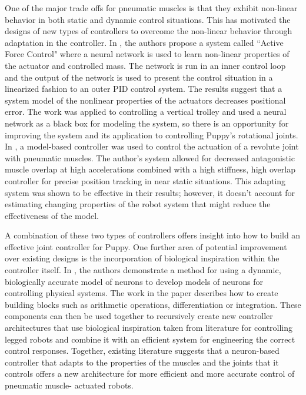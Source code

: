 One of the major trade offs for pneumatic muscles is that they exhibit
non-linear behavior in both static and dynamic control situations.
\cite{HuntPMuscles, DynamicPMuscles} This has
motivated the designs of new types of controllers to overcome the non-linear
behavior through adaptation in the controller. In \cite{Jahanabadi2009}, the
authors propose a system called ``Active Force Control" where a neural network
is used to learn non-linear properties of the actuator and controlled mass.
The network is run in an inner control loop and the output of the network is
used to present the control situation in a linearized fashion to an outer PID
control system. The results suggest that a system model of the nonlinear
properties of the actuators decreases positional error. The work was
applied to controlling a vertical trolley and used a neural network as a black
box for modeling the system, so there is an opportunity for improving the
system and its application to controlling Puppy's rotational joints.
In \cite{Wang2013}, a model-based controller was used to control the actuation
of a revolute joint with pneumatic muscles. The author's system allowed for
decreased antagonistic muscle overlap at high accelerations combined with a
high stiffness, high overlap controller for precise position tracking in near
static situations. This adapting system was shown to be effective in their
results; however, it doesn't account for estimating changing properties of the
robot system that might reduce the effectiveness of the model.

A combination of these two types of controllers offers insight into how to build
an effective joint controller for Puppy. One further area of potential
improvement over existing designs is the incorporation of biological inspiration
within the controller itself. In \cite{NickFunctionalSubnetwork}, the authors
demonstrate a method for using a dynamic, biologically accurate model of neurons
to develop models of neurons for controlling physical systems. The work in the
paper describes how to create building blocks such as arithmetic operations,
differentiation or integration. These components can then be used together to
recursively create new controller architectures that use biological inspiration
taken from literature for controlling legged robots and combine it with an
efficient system for engineering the correct control responses. Together,
existing literature suggests that a neuron-based controller that adapts to the
properties of the muscles and the joints that it controls offers a new
architecture for more efficient and more accurate control of pneumatic muscle-
actuated robots.

